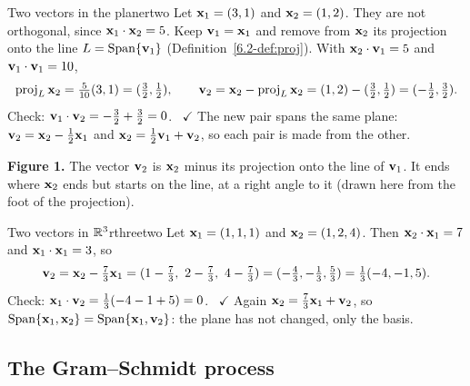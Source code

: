 \documentclass[11pt]{article}
\begin{document}
\begin{exmp}{Two vectors in the plane}{rtwo}
Let $\mathbf{x}_1=(3,1)$ and $\mathbf{x}_2=(1,2)$. They are not orthogonal, since $\mathbf{x}_1\cdot\mathbf{x}_2=5$. Keep $\mathbf{v}_1=\mathbf{x}_1$ and remove from $\mathbf{x}_2$ its projection onto the line $L=\operatorname{Span}\{\mathbf{v}_1\}$ (Definition~\ref{6.2-def:proj}). With $\mathbf{x}_2\cdot\mathbf{v}_1=5$ and $\mathbf{v}_1\cdot\mathbf{v}_1=10$,
\[
\operatorname{proj}_L\mathbf{x}_2=\tfrac{5}{10}(3,1)=(\tfrac32,\tfrac12),\qquad\mathbf{v}_2=\mathbf{x}_2-\operatorname{proj}_L\mathbf{x}_2=(1,2)-(\tfrac32,\tfrac12)=(-\tfrac12,\tfrac32).
\]
Check: $\mathbf{v}_1\cdot\mathbf{v}_2=-\tfrac32+\tfrac32=0$. \ $\checkmark$ The new pair spans the same plane: $\mathbf{v}_2=\mathbf{x}_2-\tfrac12\mathbf{x}_1$ and $\mathbf{x}_2=\tfrac12\mathbf{v}_1+\mathbf{v}_2$, so each pair is made from the other.
\end{exmp}

\begin{center}
\end{center}

\noindent\textbf{Figure 1.} The vector $\mathbf{v}_2$ is $\mathbf{x}_2$ minus its projection onto the line of $\mathbf{v}_1$. It ends where $\mathbf{x}_2$ ends but starts on the line, at a right angle to it (drawn here from the foot of the projection).

\begin{exmp}{Two vectors in $\mathbb{R}^3$}{rthreetwo}
Let $\mathbf{x}_1=(1,1,1)$ and $\mathbf{x}_2=(1,2,4)$. Then $\mathbf{x}_2\cdot\mathbf{x}_1=7$ and $\mathbf{x}_1\cdot\mathbf{x}_1=3$, so
\[
\bv{v}_2=\bv{x}_2-\tfrac73\bv{x}_1=(1-\tfrac73,\ 2-\tfrac73,\ 4-\tfrac73)=(-\tfrac43,-\tfrac13,\tfrac53)=\tfrac13(-4,-1,5).
\]
Check: $\mathbf{x}_1\cdot\mathbf{v}_2=\tfrac13(-4-1+5)=0$. \ $\checkmark$ Again $\mathbf{x}_2=\tfrac73\mathbf{x}_1+\mathbf{v}_2$, so $\operatorname{Span}\{\mathbf{x}_1,\mathbf{x}_2\}=\operatorname{Span}\{\mathbf{x}_1,\mathbf{v}_2\}$: the plane has not changed, only the basis.
\end{exmp}

\subsection*{The Gram--Schmidt process}
\end{document}
